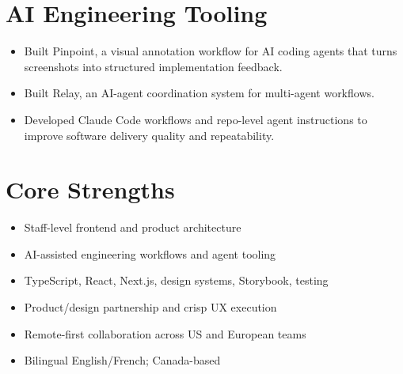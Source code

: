 \documentclass[11pt]{article}
\begin{document}
\section*{AI Engineering Tooling}
\begin{itemize}
    \item Built Pinpoint, a visual annotation workflow for AI coding agents that turns screenshots into structured implementation feedback.
    \item Built Relay, an AI-agent coordination system for multi-agent workflows.
    \item Developed Claude Code workflows and repo-level agent instructions to improve software delivery quality and repeatability.
\end{itemize}

\section*{Core Strengths}
\begin{itemize}
    \item Staff-level frontend and product architecture
    \item AI-assisted engineering workflows and agent tooling
    \item TypeScript, React, Next.js, design systems, Storybook, testing
    \item Product/design partnership and crisp UX execution
    \item Remote-first collaboration across US and European teams
    \item Bilingual English/French; Canada-based
\end{itemize}
\end{document}
